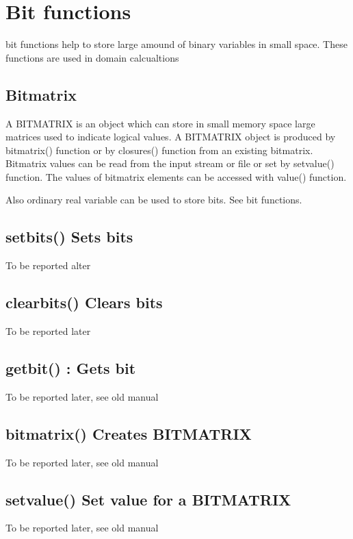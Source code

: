 \section{Bit functions}
\label{bit}
bit functions help to store large amound of binary variables in small space.
These functions are used in domain calcualtions
\subsection{Bitmatrix}
\label{bitmatrixo}
A BITMATRIX is an object which can store in small memory space large matrices
used to indicate logical values. A BITMATRIX object is produced by \textcolor{VioletRed}{bitmatrix}()
function or by \textcolor{VioletRed}{closures}() function from an existing bitmatrix. Bitmatrix values
can be read from the input stream or file or set by \textcolor{VioletRed}{setvalue}() function. The
values of bitmatrix elements can be accessed with \textcolor{VioletRed}{value}() function.
\begin{note}
Also ordinary real variable can be used to store bits. See bit functions.
\end{note}
\subsection{\textcolor{VioletRed}{setbits}() Sets bits}
\label{setbits}
To be reported alter
\subsection{\textcolor{VioletRed}{clearbits}() Clears bits}
\label{clearbits}
To be reported later
\subsection{\textcolor{VioletRed}{getbit}() : Gets bit}
\label{getbit}
To be reported later, see old manual
\subsection{\textcolor{VioletRed}{bitmatrix}() Creates BITMATRIX}
\label{bitmatrix}
To be reported later,  see old manual
\subsection{\textcolor{VioletRed}{setvalue}() Set value for a BITMATRIX}
\label{setvalue}
To be reported later,  see old manual
